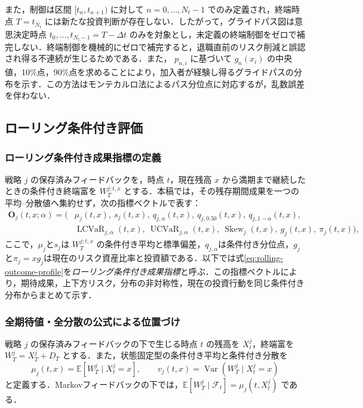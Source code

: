 \documentclass[10pt,a4paper]{article}
\theoremstyle{plain}
\theoremstyle{definition}
\newcommand{\E}{\mathbb{E}}
\DeclareMathOperator{\Var}{Var}
\begin{document}
また，制御は区間 $[t_n,t_{n+1})$ に対して $n=0,\ldots,N_t-1$ でのみ定義され，終端時点 $T=t_{N_t}$ には新たな投資判断が存在しない．したがって，グライドパス図は意思決定時点 $t_0,\ldots,t_{N_t-1}=T-\Delta t$ のみを対象とし，未定義の終端制御をゼロで補完しない．終端制御を機械的にゼロで補完すると，退職直前のリスク削減と誤認され得る不連続が生じるためである．また， $p_{n,i}$ に基づいて $g_n(x_i)$ の中央値，10\%点，90\%点を求めることにより，加入者が経験し得るグライドパスの分布を示す．この方法はモンテカルロ法によるパス分位点に対応するが，乱数誤差を伴わない．

\label{sec:rolling-definition}
\subsection{ローリング条件付き評価}
\label{sec:rolling}

\subsubsection{ローリング条件付き成果指標の定義}

戦略 $j$ の保存済みフィードバックを，時点 $t$，現在残高 $x$ から満期まで継続したときの条件付き終端富を $W_T^{j;t,x}$ とする．本稿では，その残存期間成果を一つの平均--分散値へ集約せず，次の指標ベクトルで表す：
\begin{equation}
\begin{split}
 \mathbf O_j(t,x;\alpha)=\bigl(&\mu_j(t,x),\ s_j(t,x),\ q_{j,\alpha}(t,x),\ q_{j,0.50}(t,x),\ q_{j,1-\alpha}(t,x),\\
 &\operatorname{LCVaR}_{j,\alpha}(t,x),\ \operatorname{UCVaR}_{j,\alpha}(t,x),\ \operatorname{Skew}_j(t,x),\ g_j(t,x),\ \pi_j(t,x)\bigr),
 \label{eq:rolling-outcome-profile}
\end{split}
\end{equation}
ここで，$\mu_j$と$s_j$は $W_T^{j;t,x}$ の条件付き平均と標準偏差，$q_{j,\alpha}$は条件付き分位点，$g_j$と$\pi_j=xg_j$は現在のリスク資産比率と投資額である．以下では式\eqref{eq:rolling-outcome-profile}を\emph{ローリング条件付き成果指標}と呼ぶ．この指標ベクトルにより，期待成果，上下方リスク，分布の非対称性，現在の投資行動を同じ条件付き分布からまとめて示す．

\subsubsection{全期待値・全分散の公式による位置づけ}

戦略 $j$ の保存済みフィードバックの下で生じる時点 $t$ の残高を $X_t^j$，終端富を $W_T^j=X_T^j+D_T$ とする．また，状態固定型の条件付き平均と条件付き分散を
\begin{equation}
  \mu_j(t,x)=\E\!\left[W_T^j\mid X_t^j=x\right],
  \qquad
  v_j(t,x)=\Var\!\left(W_T^j\mid X_t^j=x\right)
  \label{eq:rolling-conditional-moments}
\end{equation}
と定義する．Markovフィードバックの下では，$\E[W_T^j\mid\mathcal F_t]=\mu_j(t,X_t^j)$ である．
\end{document}
